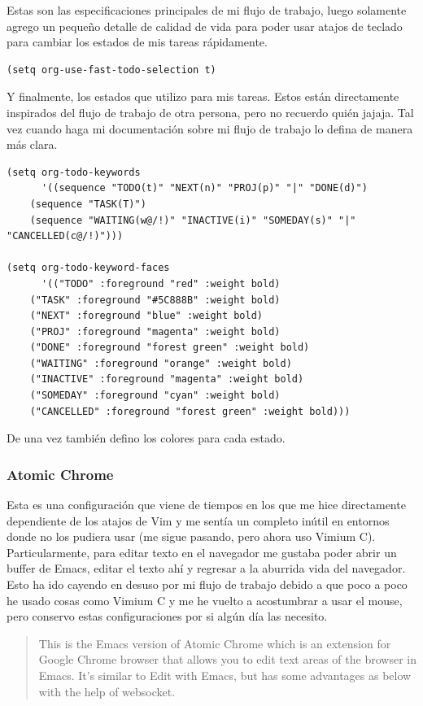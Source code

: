 \documentclass[11pt]{article}
\begin{document}
Estas son las especificaciones principales de mi flujo de trabajo, luego solamente agrego un pequeño detalle de calidad de vida para poder usar atajos de teclado para cambiar los estados de mis tareas rápidamente.

\begin{verbatim}
(setq org-use-fast-todo-selection t)
\end{verbatim}

Y finalmente, los estados que utilizo para mis tareas. Estos están directamente inspirados del flujo de trabajo de otra persona, pero no recuerdo quién jajaja. Tal vez cuando haga mi documentación sobre mi flujo de trabajo lo defina de manera más clara.

\begin{verbatim}
(setq org-todo-keywords
      '((sequence "TODO(t)" "NEXT(n)" "PROJ(p)" "|" "DONE(d)")
	(sequence "TASK(T)")
	(sequence "WAITING(w@/!)" "INACTIVE(i)" "SOMEDAY(s)" "|" "CANCELLED(c@/!)")))

(setq org-todo-keyword-faces
      '(("TODO" :foreground "red" :weight bold)
	("TASK" :foreground "#5C888B" :weight bold)
	("NEXT" :foreground "blue" :weight bold)
	("PROJ" :foreground "magenta" :weight bold)
	("DONE" :foreground "forest green" :weight bold)
	("WAITING" :foreground "orange" :weight bold)
	("INACTIVE" :foreground "magenta" :weight bold)
	("SOMEDAY" :foreground "cyan" :weight bold)
	("CANCELLED" :foreground "forest green" :weight bold)))
\end{verbatim}

De una vez también defino los colores para cada estado.
\subsubsection{Atomic Chrome}
\label{sec:org36bf41e}

Esta es una configuración que viene de tiempos en los que me hice directamente dependiente de los atajos de Vim y me sentía un completo inútil en entornos donde no los pudiera usar (me sigue pasando, pero ahora uso Vimium C). Particularmente, para editar texto en el navegador me gustaba poder abrir un buffer de Emacs, editar el texto ahí y regresar a la aburrida vida del navegador. Esto ha ido cayendo en desuso por mi flujo de trabajo debido a que poco a poco he usado cosas como Vimium C y me he vuelto a acostumbrar a usar el mouse, pero conservo estas configuraciones por si algún día las necesito.

\begin{quote}
This is the Emacs version of Atomic Chrome which is an extension for Google Chrome browser that allows you to edit text areas of the browser in Emacs. It's similar to Edit with Emacs, but has some advantages as below with the help of websocket.
\end{quote}
\end{document}
